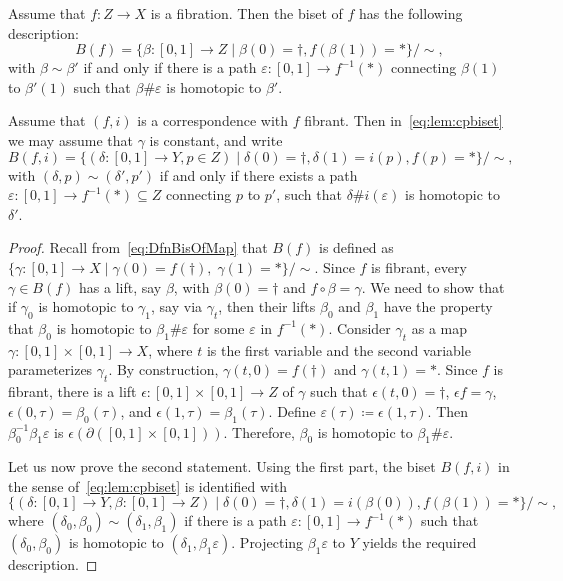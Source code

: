 \documentclass{amsart}
\begin{document}
\begin{lem}\label{lmm:FibrCorr}
  Assume that $f\colon Z\to X$ is a fibration. Then the biset of $f$ has
  the following description:
  \begin{equation}\label{eq:Bf:lmm:FibrCorr}
    B(f)=\{\beta\colon[0,1]\to Z\mid\beta(0)=\dagger,f(\beta(1))=*\}/{\sim},
  \end{equation}
  with $\beta\sim \beta'$ if and only if there is a path
  $\varepsilon\colon[0,1]\to f^{-1}(*)$ connecting $\beta(1)$ to
  $\beta'(1)$ such that $\beta\#\varepsilon$ is homotopic to $\beta'$.
    
  Assume that $(f,i)$ is a correspondence with $f$ fibrant. Then
  in~\eqref{eq:lem:cpbiset} we may assume that $\gamma$ is constant, and
  write
  \begin{equation}\label{eq:Bfi:lmm:FibrCorr}
  B(f,i)=\{(\delta\colon[0,1]\to Y,p\in Z)\mid\delta(0)=\dagger,\delta(1)=i(p),f(p)=*\}/{\sim},
  \end{equation}
  with $(\delta,p)\sim(\delta',p')$ if and only if there exists a path
  $\varepsilon\colon[0,1]\to f^{-1}(*)\subseteq Z$ connecting $p$ to $p'$,
  such that $\delta\#i(\varepsilon)$ is homotopic to $\delta'$.
\end{lem}
\begin{proof}
  Recall from~\eqref{eq:DfnBisOfMap} that $B(f)$ is defined as
  $\{\gamma\colon[0,1]\to X\mid \gamma(0)=f(\dagger),\;\gamma(1)=*\}/{\sim}$.
  Since $f$ is fibrant, every $\gamma\in B(f)$ has a lift, say
  $\beta$, with $\beta(0)=\dagger$ and $f\circ\beta = \gamma$. We need
  to show that if $\gamma_0$ is homotopic to $\gamma_1$, say via
  $\gamma_t$, then their lifts $\beta_0$ and $\beta_1$ have the
  property that $\beta_0$ is homotopic to $\beta_1\#\varepsilon$ for
  some $\varepsilon$ in $f^{-1}(*)$. Consider $\gamma_t$ as a map
  $\gamma\colon[0,1]\times [0,1]\to X$, where $t$ is the first variable and
  the second variable parameterizes $\gamma_t$. By construction,
  $\gamma(t,0)=f(\dagger)$ and $\gamma(t,1)=*$. Since $f$ is
  fibrant, there is a lift $\epsilon\colon[0,1]\times[0,1]\to Z$ of
  $\gamma$ such that $\epsilon(t,0)=\dagger$, $\epsilon f=\gamma$,
  $\epsilon(0,\tau)=\beta_0(\tau)$, and
  $\epsilon(1,\tau)=\beta_1(\tau)$. Define
  $\varepsilon(\tau)\coloneqq\epsilon(1,\tau)$. Then
  $\beta^{-1}_0\beta_1\varepsilon$ is
  $\epsilon(\partial([0,1]\times[0,1]))$. Therefore, $\beta_0$ is
  homotopic to $\beta_1\#\varepsilon$.

  Let us now prove the second statement. Using the first part, the
  biset $B(f,i)$ in the sense of~\eqref{eq:lem:cpbiset} is identified
  with
  \[\{(\delta\colon[0,1]\to Y,\beta\colon[0,1]\to
  Z)\mid\delta(0)=\dagger,\delta(1)=i(\beta(0)),f(\beta(1))=*\}/{\sim},
  \]
  where $(\delta_0,\beta_0)\sim (\delta_1,\beta_1)$ if there is a path
  $\varepsilon\colon[0,1]\to f^{-1}(*)$ such that $(\delta_0,\beta_0)$ is
  homotopic to $(\delta_1,\beta_1\varepsilon)$. Projecting
  $\beta_1\varepsilon$ to $Y$ yields the required description.
\end{proof}
\end{document}

